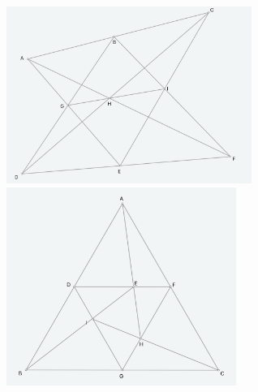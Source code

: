\documentclass[12pt,reqno]{amsart}
\theoremstyle{definition}
\begin{document}
\begin{figure}[h]
  \centering
  \includegraphics[width=8cm]{hw4a}
  \includegraphics[width=7.5cm]{hw4b}
\end{figure}
\end{document}

